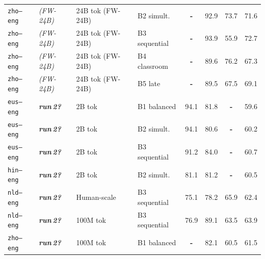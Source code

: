 \begin{table}[t]
\begin{tabular}{lll l cc cc}
\texttt{zho--eng} & \textit{(FW-24B)} & 24B tok (FW-24B) & B2 simult. & \textbf{-} & \cellcolor[rgb]{0.766,1.000,0.766} 92.9 & \cellcolor[rgb]{0.832,1.000,0.832} 73.7 & \cellcolor[rgb]{0.822,1.000,0.822} 71.6 \\
\texttt{zho--eng} & \textit{(FW-24B)} & 24B tok (FW-24B) & B3 sequential & \textbf{-} & \cellcolor[rgb]{0.761,1.000,0.761} 93.9 & \cellcolor[rgb]{0.958,1.000,0.958} 55.9 & \cellcolor[rgb]{0.813,1.000,0.813} 72.7 \\
\texttt{zho--eng} & \textit{(FW-24B)} & 24B tok (FW-24B) & B4 classroom & \textbf{-} & \cellcolor[rgb]{0.784,1.000,0.784} 89.6 & \cellcolor[rgb]{0.814,1.000,0.814} 76.2 & \cellcolor[rgb]{0.858,1.000,0.858} 67.3 \\
\texttt{zho--eng} & \textit{(FW-24B)} & 24B tok (FW-24B) & B5 late & \textbf{-} & \cellcolor[rgb]{0.785,1.000,0.785} 89.5 & \cellcolor[rgb]{0.876,1.000,0.876} 67.5 & \cellcolor[rgb]{0.843,1.000,0.843} 69.1 \\
\texttt{eus--eng} & \textit{\textbf{run\,2?}} & 2B tok & B1 balanced & \cellcolor[rgb]{0.756,1.000,0.756} 94.1 & \cellcolor[rgb]{0.827,1.000,0.827} 81.8 & \textbf{-} & \cellcolor[rgb]{0.921,1.000,0.921} 59.6 \\
\texttt{eus--eng} & \textit{\textbf{run\,2?}} & 2B tok & B2 simult. & \cellcolor[rgb]{0.756,1.000,0.756} 94.1 & \cellcolor[rgb]{0.833,1.000,0.833} 80.6 & \textbf{-} & \cellcolor[rgb]{0.916,1.000,0.916} 60.2 \\
\texttt{eus--eng} & \textit{\textbf{run\,2?}} & 2B tok & B3 sequential & \cellcolor[rgb]{0.772,1.000,0.772} 91.2 & \cellcolor[rgb]{0.815,1.000,0.815} 84.0 & \textbf{-} & \cellcolor[rgb]{0.912,1.000,0.912} 60.7 \\
\texttt{hin--eng} & \textit{\textbf{run\,2?}} & 2B tok & B2 simult. & \cellcolor[rgb]{0.828,1.000,0.828} 81.1 & \cellcolor[rgb]{0.830,1.000,0.830} 81.2 & \textbf{-} & \cellcolor[rgb]{0.914,1.000,0.914} 60.5 \\
\texttt{nld--eng} & \textit{\textbf{run\,2?}} & Human-scale & B3 sequential & \cellcolor[rgb]{0.861,1.000,0.861} 75.1 & \cellcolor[rgb]{0.846,1.000,0.846} 78.2 & \cellcolor[rgb]{0.887,1.000,0.887} 65.9 & \cellcolor[rgb]{0.898,1.000,0.898} 62.4 \\
\texttt{nld--eng} & \textit{\textbf{run\,2?}} & 100M tok & B3 sequential & \cellcolor[rgb]{0.851,1.000,0.851} 76.9 & \cellcolor[rgb]{0.787,1.000,0.787} 89.1 & \cellcolor[rgb]{0.904,1.000,0.904} 63.5 & \cellcolor[rgb]{0.886,1.000,0.886} 63.9 \\
\texttt{zho--eng} & \textit{\textbf{run\,2?}} & 100M tok & B1 balanced & \textbf{-} & \cellcolor[rgb]{0.825,1.000,0.825} 82.1 & \cellcolor[rgb]{0.925,1.000,0.925} 60.5 & \cellcolor[rgb]{0.905,1.000,0.905} 61.5 \\

\end{tabular}
\end{table}
